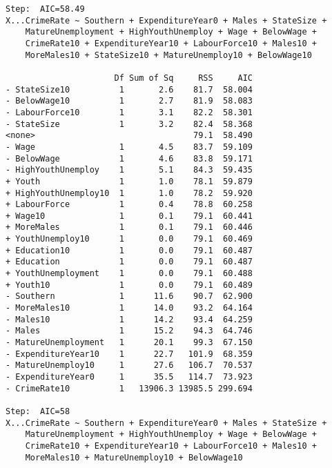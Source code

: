 \documentclass[11pt]{article}
\begin{document}
\begin{enumerate}
\begin{verbatim}
Step:  AIC=58.49
X...CrimeRate ~ Southern + ExpenditureYear0 + Males + StateSize + 
    MatureUnemployment + HighYouthUnemploy + Wage + BelowWage + 
    CrimeRate10 + ExpenditureYear10 + LabourForce10 + Males10 + 
    MoreMales10 + StateSize10 + MatureUnemploy10 + BelowWage10

                      Df Sum of Sq     RSS     AIC
- StateSize10          1       2.6    81.7  58.004
- BelowWage10          1       2.7    81.9  58.083
- LabourForce10        1       3.1    82.2  58.301
- StateSize            1       3.2    82.4  58.368
<none>                                79.1  58.490
- Wage                 1       4.5    83.7  59.109
- BelowWage            1       4.6    83.8  59.171
- HighYouthUnemploy    1       5.1    84.3  59.435
+ Youth                1       1.0    78.1  59.879
+ HighYouthUnemploy10  1       1.0    78.2  59.920
+ LabourForce          1       0.4    78.8  60.258
+ Wage10               1       0.1    79.1  60.441
+ MoreMales            1       0.1    79.1  60.446
+ YouthUnemploy10      1       0.0    79.1  60.469
+ Education10          1       0.0    79.1  60.487
+ Education            1       0.0    79.1  60.487
+ YouthUnemployment    1       0.0    79.1  60.488
+ Youth10              1       0.0    79.1  60.489
- Southern             1      11.6    90.7  62.900
- MoreMales10          1      14.0    93.2  64.164
- Males10              1      14.2    93.4  64.259
- Males                1      15.2    94.3  64.746
- MatureUnemployment   1      20.1    99.3  67.150
- ExpenditureYear10    1      22.7   101.9  68.359
- MatureUnemploy10     1      27.6   106.7  70.537
- ExpenditureYear0     1      35.5   114.7  73.923
- CrimeRate10          1   13906.3 13985.5 299.694

Step:  AIC=58
X...CrimeRate ~ Southern + ExpenditureYear0 + Males + StateSize + 
    MatureUnemployment + HighYouthUnemploy + Wage + BelowWage + 
    CrimeRate10 + ExpenditureYear10 + LabourForce10 + Males10 + 
    MoreMales10 + MatureUnemploy10 + BelowWage10


\end{verbatim}
\end{enumerate}
\end{document}
